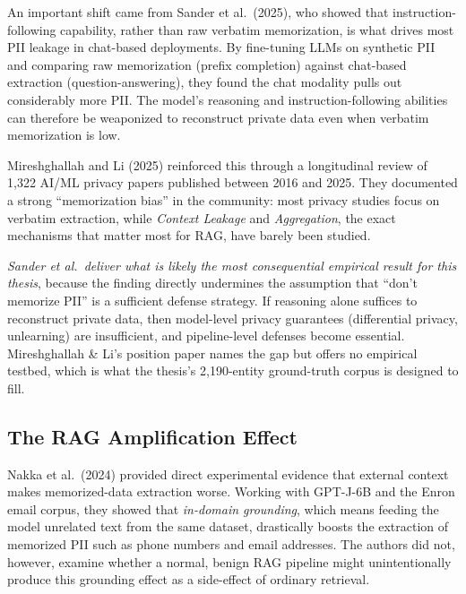 \documentclass[12pt,a4paper]{report}
\begin{document}
An important shift came from Sander et al.\ (2025), who showed that instruction-following capability, rather than raw verbatim memorization, is what drives most PII leakage in chat-based deployments. By fine-tuning LLMs on synthetic PII and comparing raw memorization (prefix completion) against chat-based extraction (question-answering), they found the chat modality pulls out considerably more PII. The model's reasoning and instruction-following abilities can therefore be weaponized to reconstruct private data even when verbatim memorization is low.

Mireshghallah and Li (2025) reinforced this through a longitudinal review of 1{,}322 AI/ML privacy papers published between 2016 and 2025. They documented a strong ``memorization bias'' in the community: most privacy studies focus on verbatim extraction, while \emph{Context Leakage} and \emph{Aggregation}, the exact mechanisms that matter most for RAG, have barely been studied.

\begin{critbox}
\textit{Sander et al.\ deliver what is likely the most consequential empirical result for this thesis}, because the finding directly undermines the assumption that ``don't memorize PII'' is a sufficient defense strategy. If reasoning alone suffices to reconstruct private data, then model-level privacy guarantees (differential privacy, unlearning) are insufficient, and pipeline-level defenses become essential. Mireshghallah \& Li's position paper names the gap but offers no empirical testbed, which is what the thesis's 2{,}190-entity ground-truth corpus is designed to fill.
\end{critbox}

\subsection{The RAG Amplification Effect}
\label{subsec:rag-amplification}

Nakka et al.\ (2024) provided direct experimental evidence that external context makes memorized-data extraction worse. Working with GPT-J-6B and the Enron email corpus, they showed that \emph{in-domain grounding}, which means feeding the model unrelated text from the same dataset, drastically boosts the extraction of memorized PII such as phone numbers and email addresses. The authors did not, however, examine whether a normal, benign RAG pipeline might unintentionally produce this grounding effect as a side-effect of ordinary retrieval.
\end{document}
